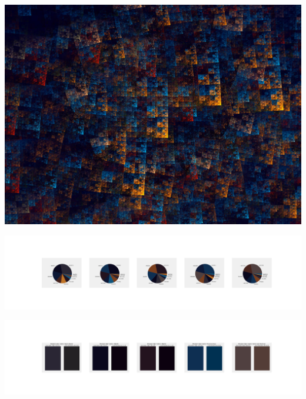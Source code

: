 \documentclass[11pt]{article}
\begin{document}
\begin{landscape}
    \begin{center}
    \includegraphics[width=\textwidth]{./nbimg/file (213).jpg}
    \end{center}

    \begin{center}
    \includegraphics[width=250mm]{./nbimg/pie-127.jpg}
    \end{center}

    \begin{center}
    \includegraphics[width=250mm]{./nbimg/peak-127.jpg}
    \end{center}
    


\end{landscape}
\end{document}
